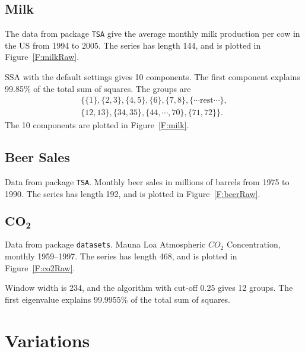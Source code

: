 \documentclass[11pt]{amsart}
\theoremstyle{plain}
\theoremstyle{definition}
\theoremstyle{remark}
\begin{document}
\subsection{Milk}
The data from package \texttt{TSA} give the average monthly milk production per cow in the US from 1994 to 2005. The series has length 144, and is plotted in Figure~\ref{F:milkRaw}.
\begin{center}
\end{center}
SSA with the default settings gives 10 components. The first component explains 99.85\% of the total sum of squares. The groups are
\begin{multline*}
\{\{1\},\{2,3\},\{4,5\},\{6\},\{7,8\},\{\cdots\text{rest}\cdots\},\\
\{12,13\},\{34,35\},\{44,\cdots,70\},\{71,72\}\}.
\end{multline*}
The 10 components are plotted in Figure~\ref{F:milk}.
\begin{center}
\end{center}
%
\subsection{Beer Sales}
Data from package \texttt{TSA}. Monthly beer sales in millions of barrels from 1975 to 1990. The series has length 192, and is plotted in Figure~\ref{F:beerRaw}.
\begin{center}
\end{center}
\begin{center}
\end{center}
\subsection{$\mathbf{CO_2}$}
Data from package \texttt{datasets}. Mauna Loa Atmospheric \(CO_2\) Concentration, monthly  1959--1997. The series has length 468, and is plotted
in Figure~\ref{F:co2Raw}. 
\begin{center}
\end{center}
Window width is 234, and the algorithm with cut-off 0.25 gives 12 groups. The first eigenvalue explains 99.9955\% of the total sum of squares. 
\section{Variations}
\end{document}

